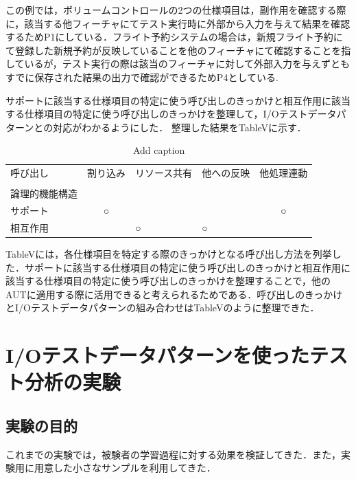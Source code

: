 この例では，ボリュームコントロールの2つの仕様項目は，副作用を確認する際に，該当する他フィーチャにてテスト実行時に外部から入力を与えて結果を確認するためP1にしている．フライト予約システムの場合は，新規フライト予約にて登録した新規予約が反映していることを他のフィーチャにて確認することを指しているが，テスト実行の際は該当のフィーチャに対して外部入力を与えずともすでに保存された結果の出力で確認ができるためP4としている.

サポートに該当する仕様項目の特定に使う呼び出しのきっかけと相互作用に該当する仕様項目の特定に使う呼び出しのきっかけを整理して，I/Oテストデータパターンとの対応がわかるようにした．
整理した結果をTableVに示す．
\begin{table}[htbp]
  \centering
  \caption{Add caption}
    \begin{tabular}{|p{4em}|c|p{4em}|p{4em}|c|}
    \hline
    呼び出し  & \multicolumn{1}{p{4em}|}{割り込み} & リソース共有 & 他への反映 & \multicolumn{1}{p{4em}|}{他処理連動} \bigstrut[t]\\
    \multicolumn{1}{|l|}{} &       & \multicolumn{1}{r|}{} & \multicolumn{1}{r|}{} &  \\
    論理的機能構造 &       & \multicolumn{1}{r|}{} & \multicolumn{1}{r|}{} &  \bigstrut[b]\\
    \hline
    サポート  & \multicolumn{1}{p{4em}|}{○} & \multicolumn{1}{c|}{} & \multicolumn{1}{c|}{} & \multicolumn{1}{p{4em}|}{○} \bigstrut\\
    \hline
    相互作用  &       & ○     & ○     &  \bigstrut\\
    \hline
    \end{tabular}%
  \label{tab:addlabel}%
\end{table}%

TableVには，各仕様項目を特定する際のきっかけとなる呼び出し方法を列挙した．サポートに該当する仕様項目の特定に使う呼び出しのきっかけと相互作用に該当する仕様項目の特定に使う呼び出しのきっかけを整理することで，他のAUTに適用する際に活用できると考えられるためである．呼び出しのきっかけとI/Oテストデータパターンの組み合わせはTableVのように整理できた．

\section{I/Oテストデータパターンを使ったテスト分析の実験} \label{sec:4-2}
\subsection{実験の目的} \label{sec:4-2-1}
これまでの実験では，被験者の学習過程に対する効果を検証してきた．また，実験用に用意した小さなサンプルを利用してきた．

